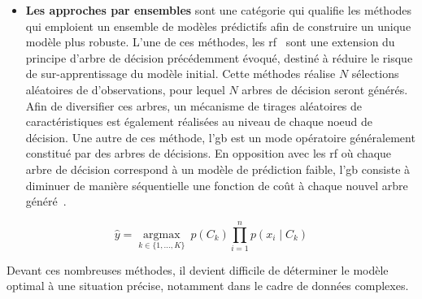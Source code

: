\begin{itemize}
    \item \textbf{Les approches par ensembles} sont une catégorie qui qualifie les méthodes qui emploient un ensemble de modèles prédictifs afin de construire un unique modèle plus robuste. L'une de ces méthodes, les \gls{rf}~\cite{Breiman2001} sont une extension du principe d'arbre de décision précédemment évoqué, destiné à réduire le risque de sur-apprentissage du modèle initial. Cette méthodes réalise $N$ sélections aléatoires de d'observations, pour lequel $N$ arbres de décision seront générés. Afin de diversifier ces arbres, un mécanisme de tirages aléatoires de caractéristiques est également réalisées au niveau de chaque noeud de décision. Une autre de ces méthode, l'\gls{gb} est un mode opératoire généralement constitué par des arbres de décisions. En opposition avec les \gls{rf} où chaque arbre de décision correspond à un modèle de prédiction faible, l'\gls{gb} consiste à diminuer de manière séquentielle une fonction de coût à chaque nouvel arbre généré~\cite{Friedman2001}.
\end{itemize}\par

\begin{equation} 
    \label{eq:bayesian}
    \hat{y} = \underset{k \in \{1, \ldots, K\}}{\operatorname{argmax}} \ p(C_k) \displaystyle\prod_{i=1}^n p(x_i \mid C_k)
\end{equation}

Devant ces nombreuses méthodes, il devient difficile de déterminer le modèle optimal à une situation précise, notamment dans le cadre de données complexes.
~\cite{Kotsiantis2007}

